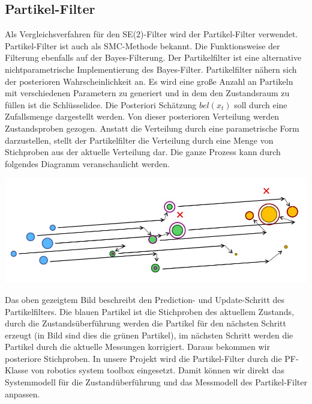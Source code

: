 \subsection{Partikel-Filter}
Als Vergleichsverfahren für den SE(2)-Filter wird der Partikel-Filter verwendet. Partikel-Filter ist auch als SMC-Methode bekannt. Die Funktionsweise der Filterung ebenfalls auf der Bayes-Filterung. Der Partikelfilter ist eine alternative nichtparametrische Implementierung des Bayes-Filter. Partikelfilter nähern sich der posterioren Wahrscheinlichkeit an. 
Es wird eine große Anzahl an Partikeln mit verschiedenen Parametern zu generiert und in dem den Zustandsraum zu füllen ist die Schlüsselidee.
Die Posteriori Schätzung $bel(x_{t})$ soll durch eine Zufallsmenge dargestellt werden. Von dieser posterioren Verteilung werden Zustandsproben gezogen. Anstatt die Verteilung durch eine parametrische Form darzustellen, stellt der Partikelfilter die Verteilung durch eine Menge von Stichproben aus der aktuelle Verteilung dar. Die ganze Prozess kann durch folgendes Diagramm veranschaulicht werden.

    {\centering
    \includegraphics[width=15cm]{Images/pf.jpg}}
    
Das oben gezeigtem Bild beschreibt den Prediction- und Update-Schritt des Partikelfilters. Die blauen Partikel ist die Stichproben des aktuellem Zustands, durch die Zustandsüberführung werden die Partikel für den nächsten Schritt erzeugt (in Bild sind dies die grünen Partikel), im nächsten Schritt werden die Partikel durch die aktuelle Messungen korrigiert. Daraus bekommen wir posteriore Stichproben.
In unsere Projekt wird die Partikel-Filter durch die PF-Klasse von robotics system toolbox eingesetzt. Damit können wir direkt das Systemmodell für die Zustandüberführung und das Messmodell des Partikel-Filter anpassen.